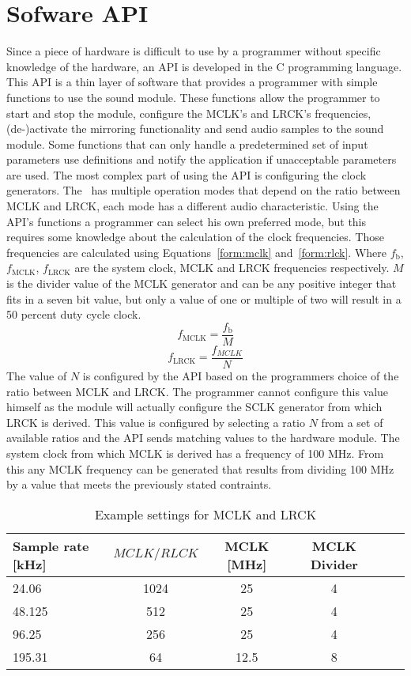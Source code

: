 \section{Sofware API}\label{sec:software}
Since a piece of hardware is difficult to use by a programmer without specific knowledge of the hardware, an API is developed in the C programming language. This API is a thin layer of software that provides a programmer with simple functions to use the sound module. These functions allow the programmer to start and stop the module, configure the MCLK's and LRCK's frequencies, (de-)activate the mirroring functionality and send audio samples to the sound module. Some functions that can only handle a predetermined set of input parameters use definitions and notify the application if unacceptable parameters are used. The most complex part of using the API is configuring the clock generators. The \cs~has multiple operation modes that depend on the ratio between MCLK and LRCK, each mode has a different audio characteristic. Using the API's functions a programmer can select his own preferred mode, but this requires some knowledge about the calculation of the clock frequencies. Those frequencies are calculated using Equations~\ref{form:mclk} and~\ref{form:rlck}. Where $f_\text{b}$, $f_\text{MCLK}$, $f_\text{LRCK}$ are the system clock, MCLK and LRCK frequencies respectively. $M$ is the divider value of the MCLK generator and can be any positive integer that fits in a seven bit value, but only a value of one or multiple of two will result in a 50 percent duty cycle clock. 
\begin{equation}
\label{form:mclk}
f_\text{MCLK} = \frac{f_\text{b}}{M}
\end{equation}
\begin{equation}
\label{form:rlck}
f_\text{LRCK} = \frac{f_{MCLK}}{N}
\end{equation}
The value of $N$ is configured by the API based on the programmers choice of the ratio between MCLK and LRCK. The programmer cannot configure this value himself as the module will actually configure the SCLK generator from which LRCK is derived. This value is configured by selecting a ratio $N$ from a set of available ratios and the API sends matching values to the hardware module.
\noindent The system clock from which MCLK is derived has a frequency of 100 MHz. From this any MCLK frequency can be generated that results from dividing 100 MHz by a value that meets the previously stated contraints. 
\begin{table}[h]
 \setlength{\tabcolsep}{5pt}
 \centering
 \caption{Example settings for MCLK and LRCK}
 \begin{tabular}{ | l || c | c | c | c | c | }
  \hline
  Sample rate [kHz]		& $MCLK/RLCK$ 	& MCLK [MHz] 	& MCLK Divider \\ 
  \hline
  24.06			& 1024 		& 25 		  	& 4 \\
  48.125 			& 512 			& 25 			& 4 \\
  96.25 			& 256 			& 25 			& 4 \\
  195.31			& 64			& 12.5 		& 8 \\
 \hline
 \end{tabular}
 \label{table:ratios} 
\end{table} 
